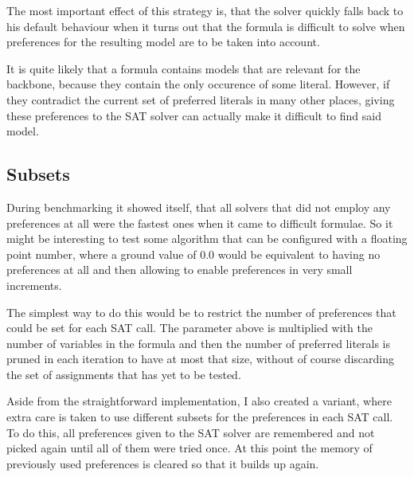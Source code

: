 The most important effect of this strategy is, that the solver quickly falls back to his default behaviour when it turns out that the formula is difficult to solve when preferences for the resulting model are to be taken into account. 

It is quite likely that a formula contains models that are relevant for the backbone, because they contain the only occurence of some literal. However, if they contradict the current set of preferred literals in many other places, giving these preferences to the SAT solver can actually make it difficult to find said model.

\subsection{Subsets}
\label{sec:subsets}
During benchmarking it showed itself, that all solvers that did not employ any preferences at all were the fastest ones when it came to difficult formulae. So it might be interesting to test some algorithm that can be configured with a floating point number, where a ground value of $0.0$ would be equivalent to having no preferences at all and then allowing to enable preferences in very small increments.

The simplest way to do this would be to restrict the number of preferences that could be set for each SAT call. The parameter above is multiplied with the number of variables in the formula and then the number of preferred literals is pruned in each iteration to have at most that size, without of course discarding the set of assignments that has yet to be tested.

Aside from the straightforward implementation, I also created a variant, where extra care is taken to use different subsets for the preferences in each SAT call. To do this, all preferences given to the SAT solver are remembered and not picked again until all of them were tried once. At this point the memory of previously used preferences is cleared so that it builds up again.





